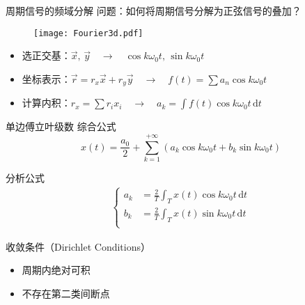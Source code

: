 \documentclass[UTF8]{ctexbeamer}
\begin{document}
\begin{frame}{周期信号的频域分解}
    问题：如何将周期信号分解为正弦信号的叠加？

    \begin{figure}
        \centering
        \texttt{[image: Fourier3d.pdf]}
    \end{figure}

    \small
    \begin{tcolorbox}[boxrule=0.3pt,
        fontupper = \zihao{-5}\normalcolor]
        \begin{itemize}
            \item 选正交基：$\vec{x},\, \vec{y} \quad\rightarrow\quad \cos k \omega_0 t ,\, \sin k\omega_0 t$
            \item 坐标表示：$\vec{r} = r_x \vec{x} + r_y \vec{y}  \quad\rightarrow\quad f(t) = \sum a_n \cos  k \omega_0 t$
            \item 计算内积：$r_x = \sum r_i x_i \quad\rightarrow\quad a_k = \int f(t) \cos k \omega_0 t\, \mathrm{d}t$ 
        \end{itemize}
    \end{tcolorbox}
\end{frame}


\begin{frame}{单边傅立叶级数}
    综合公式
    \begin{equation*}
        x(t) = \frac{a_0}{2} + \sum_{k=1}^{+\infty} \left(a_k \cos k\omega_0t + b_k \sin k\omega_0t\right)
    \end{equation*}

    分析公式
    \begin{gather*}
        \left\{\begin{aligned}
            a_k &= \frac{2}{T} \int_T x(t) \cos k\omega_0t \,\mathrm{d}t \\
            b_k &= \frac{2}{T} \int_T x(t) \sin k\omega_0t \,\mathrm{d}t \\
        \end{aligned}\right.
    \end{gather*}

    收敛条件（Dirichlet Conditions）
    \begin{itemize}
        \item 周期内绝对可积
        \item 不存在第二类间断点
    \end{itemize}
\end{frame}
\end{document}
